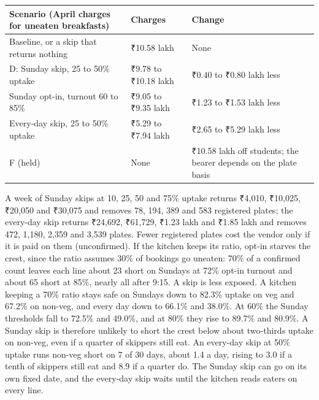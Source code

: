 \documentclass[
  10pt,
  table]{article}
\newcounter{none} %
\begin{document}
{\def\LTcaptype{none} %
\begin{longtable}[]{@{}
  >{\raggedright\arraybackslash}p{}
  >{\raggedright\arraybackslash}p{}
  >{\raggedright\arraybackslash}p{}@{}}
\toprule\noalign{}
\begin{minipage}[b]{\linewidth}\raggedright
\cellcolor{pblue}\color{white}\bfseries Scenario (April charges for uneaten breakfasts)
\end{minipage} & \begin{minipage}[b]{\linewidth}\raggedright
\cellcolor{pblue}\color{white}\bfseries Charges
\end{minipage} & \begin{minipage}[b]{\linewidth}\raggedright
\cellcolor{pblue}\color{white}\bfseries Change
\end{minipage} \\
\midrule\noalign{}
\endhead
\bottomrule\noalign{}
\endlastfoot
Baseline, or a skip that returns nothing & ₹10.58 lakh & None \\
D: Sunday skip, 25 to 50\% uptake & ₹9.78 to ₹10.18 lakh & ₹0.40 to ₹0.80 lakh less \\
Sunday opt-in, turnout 60 to 85\% & ₹9.05 to ₹9.35 lakh & ₹1.23 to ₹1.53 lakh less \\
Every-day skip, 25 to 50\% uptake & ₹5.29 to ₹7.94 lakh & ₹2.65 to ₹5.29 lakh less \\
F (held) & None & ₹10.58 lakh off students; the bearer depends on the plate basis \\
\end{longtable}
}

A week of Sunday skips at 10, 25, 50 and 75\% uptake returns ₹4,010, ₹10,025, ₹20,050 and ₹30,075 and removes 78, 194, 389 and 583 registered plates; the every-day skip returns ₹24,692, ₹61,729, ₹1.23 lakh and ₹1.85 lakh and removes 472, 1,180, 2,359 and 3,539 plates. Fewer registered plates cost the vendor only if it is paid on them (unconfirmed). If the kitchen keeps its ratio, opt-in starves the crest, since the ratio assumes 30\% of bookings go uneaten: 70\% of a confirmed count leaves each line about 23 short on Sundays at 72\% opt-in turnout and about 65 short at 85\%, nearly all after 9:15. A skip is less exposed. A kitchen keeping a 70\% ratio stays safe on Sundays down to 82.3\% uptake on veg and 67.2\% on non-veg, and every day down to 66.1\% and 38.0\%. At 60\% the Sunday thresholds fall to 72.5\% and 49.0\%, and at 80\% they rise to 89.7\% and 80.9\%. A Sunday skip is therefore unlikely to short the crest below about two-thirds uptake on non-veg, even if a quarter of skippers still eat. An every-day skip at 50\% uptake runs non-veg short on 7 of 30 days, about 1.4 a day, rising to 3.0 if a tenth of skippers still eat and 8.9 if a quarter do. The Sunday skip can go on its own fixed date, and the every-day skip waits until the kitchen reads eaters on every line.
\end{document}
